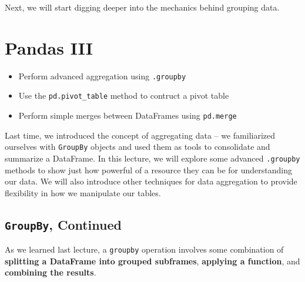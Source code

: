 \documentclass[
  letterpaper,
  DIV=11,
  numbers=noendperiod]{scrreprt}
\providecommand{\tightlist}{%
  \setlength{\itemsep}{0pt}\setlength{\parskip}{0pt}}\usepackage{longtable,booktabs,array}
\begin{document}
Next, we will start digging deeper into the mechanics behind grouping
data.


\hypertarget{pandas-iii}{%
\chapter{Pandas III}\label{pandas-iii}}

\begin{tcolorbox}[enhanced jigsaw, toptitle=1mm, left=2mm, colback=white, bottomtitle=1mm, colbacktitle=quarto-callout-note-color!10!white, rightrule=.15mm, breakable, coltitle=black, colframe=quarto-callout-note-color-frame, title=\textcolor{quarto-callout-note-color}{\faInfo}\hspace{0.5em}{Note}, toprule=.15mm, titlerule=0mm, arc=.35mm, bottomrule=.15mm, leftrule=.75mm, opacityback=0, opacitybacktitle=0.6]

\begin{itemize}
\tightlist
\item
  Perform advanced aggregation using \texttt{.groupby}
\item
  Use the \texttt{pd.pivot\_table} method to contruct a pivot table
\item
  Perform simple merges between DataFrames using \texttt{pd.merge}
\end{itemize}

\end{tcolorbox}

Last time, we introduced the concept of aggregating data -- we
familiarized ourselves with \texttt{GroupBy} objects and used them as
tools to consolidate and summarize a DataFrame. In this lecture, we will
explore some advanced \texttt{.groupby} methods to show just how
powerful of a resource they can be for understanding our data. We will
also introduce other techniques for data aggregation to provide
flexibility in how we manipulate our tables.

\hypertarget{groupby-continued}{%
\section{\texorpdfstring{\texttt{GroupBy},
Continued}{GroupBy, Continued}}\label{groupby-continued}}

As we learned last lecture, a \texttt{groupby} operation involves some
combination of \textbf{splitting a DataFrame into grouped subframes},
\textbf{applying a function}, and \textbf{combining the results}.
\end{document}
